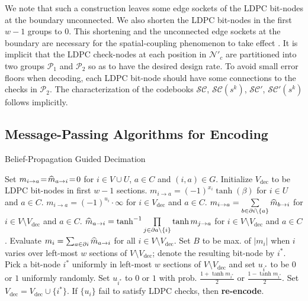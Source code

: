 We note that such a construction leaves some edge sockets of the LDPC bit-nodes at the boundary unconnected.
We also shorten the LDPC bit-nodes in the first $w-1$ groups to $0$.
This shortening and the unconnected edge sockets at the boundary are necessary for the spatial-coupling phenomenon to take effect \cite{Kudekar-it11}.
It is implicit that the LDPC check-nodes at each position in $\mathcal{N}'_c$ are partitioned into two groups $\mathcal{P}_1$ and $\mathcal{P}_2$ so as to have the desired design rate.
To avoid small error floors when decoding, each LDPC bit-node should have some connections to the checks in $\mathcal{P}_2$.
The characterization of the codebooks $\mathcal{SC}$, $\mathcal{SC}(s^k)$, $\mathcal{SC}'$, $\mathcal{SC}'(s^k)$ follows implicitly.

\subsection{Message-Passing Algorithms for Encoding}
\begin{algorithm}[!t]
\begin{algorithmic}
  \caption{Belief-Propagation Guided Decimation}
  \label{algorithm:bpgd}
  \STATE Set $m_{i \to a}\!=\!\widehat{m}_{a \to i}\!=\!0$ for $i \in V \cup U$, $a \in C$ and $(i,a) \in G$.
  \STATE Initialize $V_{\mathrm{dec}}$ to be LDPC bit-nodes in first $w-1$ sections.
      \STATE $m_{i \to a} = (-1)^{x_i} \tanh(\beta)$ for $i \in U$ and $a \in C$.
      \STATE $m_{i \to a} = (-1)^{u_i} \cdotp \infty$ for $i \in V_{\mathrm{dec}}$ and $a \in C$.
      \STATE $m_{i \to a} = \sum\limits_{b \in \partial i \setminus \{a\}} \widehat{m}_{b \to i}$ for $i \in V \setminus V_{\mathrm{dec}}$ and $a \in C$.
      \STATE $\widehat{m}_{a \to i} = \tanh^{-1} \prod\limits_{j \in \partial a \setminus \{ i \} } \tanh m_{j \to a}$ for $i \in V \setminus V_{\mathrm{dec}}$ and $a \in C$.
    \ENDFOR
    \STATE Evaluate $m_{i}=\sum_{a \in \partial i} \widehat{m}_{a \to i} $ for all $i \in V\setminus V_{\mathrm{dec}}$.
    \STATE Set $B$ to be max. of $|m_i|$ when $i$ varies over left-most $w$ sections of $V \setminus V_{\mathrm{dec}}$; denote the resulting bit-node by $i^*$.
      \STATE Pick a bit-node $i^*$ uniformly in left-most $w$ sections of $V \setminus V_{\mathrm{dec}}$ and set $u_{i^*}$ to be $0$ or $1$ uniformly randomly.
    \ELSE
      \STATE Set $u_{i^*}$ to $0$ or $1$ with prob. $\frac{1+\tanh m_{i^*}}{2}$ or $\frac{1-\tanh m_{i^*}}{2}$.
    \ENDIF
    \STATE Set $V_{\mathrm{dec}} = V_{\mathrm{dec}} \cup \{i^*\}$.
  \ENDWHILE
  \STATE If $\{u_{i}\}$ fail to satisfy LDPC checks, then \textbf{re-encode}.
\end{algorithmic}
\end{algorithm}

